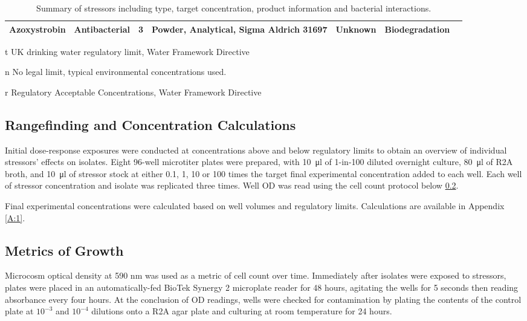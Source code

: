 \documentclass[final,1p,times]{elsarticle}
\begin{document}
\begin{landscape}
\begin{table}[ht]
\begin{threeparttable}
\begin{tabular}{l M l M L L c}
\textbf{Azoxystrobin} & Antibacterial & 3 & Powder, Analytical, Sigma Aldrich 31697 & Unknown & Biodegradation & \cite{Battaglin2011Occurrence20052006,Rodrigues2013,Loos2010Pan-EuropeanWater,Bacmaga2015MicrobialAzoxystrobin} \\
\bottomrule
\end{tabular}
\caption{Summary of stressors including type, target concentration, product information and bacterial interactions.}
\label{tab:stressors}
\begin{tablenotes}
\item [t] UK drinking water regulatory limit, Water Framework Directive
\item [n] No legal limit, typical environmental concentrations used.
\item [r] Regulatory Acceptable Concentrations, Water Framework Directive 
\end{tablenotes}
\end{threeparttable}
\end{table}
\end{landscape}


\subsection{Rangefinding and Concentration Calculations}
\label{S:2:3}

Initial dose-response exposures were conducted at concentrations above and below regulatory limits to obtain an overview of individual stressors' effects on isolates. Eight 96-well microtiter plates were prepared, with  \SI{10}{\ul} of 1-in-100 diluted overnight culture, \SI{80}{\ul} of R2A broth, and \SI{10}{\ul} of stressor stock at either 0.1, 1, 10 or 100 times the target final experimental concentration added to each well. Each well of stressor concentration and isolate was replicated three times. Well OD was read using the cell count protocol below  \ref{S:2:4}.

Final experimental concentrations were calculated based on well volumes and regulatory limits. Calculations are available in Appendix \ref{A:1}.

\subsection{Metrics of Growth}
\label{S:2:4}

Microcosm optical density at 590 nm was used as a metric of cell count over time. Immediately after isolates were exposed to stressors, plates were placed in an automatically-fed BioTek Synergy 2 microplate reader for 48 hours, agitating the wells for 5 seconds then reading absorbance every four hours.  At the conclusion of OD readings, wells were checked for contamination by plating the contents of the control plate at $10^{-3}$ and $10^{-4}$ dilutions onto a R2A agar plate and culturing at room temperature for 24 hours.
\end{document}
